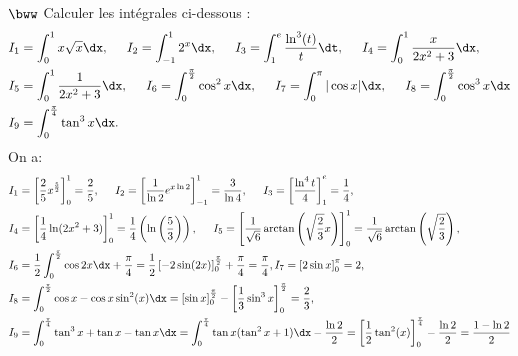 \documentclass[11pt]{article}
\begin{document}
\begin{exercice}{$\bww$}{}
    Calculer les intégrales ci-dessous :
    \begin{align*}
        &I_1 = \int_0^1{x\sqrt{x}\dx}, \hspace{0.5cm} I_2 = \int_{-1}^1{2^x\dx}, \hspace{0.5cm} I_3=\int_1^e{\frac{\ln^3(t)}{t}\dt}, \hspace{0.5cm} I_4=\int_0^1{\frac{x}{2x^2+3}\dx},\\
        &I_5=\int_0^1{\frac{1}{2x^2+3}\dx}, \hspace{0.5cm} I_6=\int_0^{\frac{\pi}{2}}{\cos^2x\dx}, \hspace{0.5cm} I_7=\int_0^\pi{|\cos x|\dx}, \hspace{0.5cm} I_8 = \int_0^{\frac{\pi}{2}}{\cos^3x\dx}\\
        &I_9=\int_0^{\frac{\pi}{4}}{\tan^3x\dx}.
    \end{align*}
    \tcblower
    On a:
    \begin{align*}
        &I_1 = \left[\frac{2}{5}x^{\frac{5}{2}}\right]_0^1=\frac{2}{5}, \hspace{0.5cm} I_2=\left[\frac{1}{\ln2}e^{x\ln2}\right]_{-1}^1=\frac{3}{\ln4}, \hspace{0.5cm} I_3=\left[\frac{\ln^4t}{4}\right]_1^e=\frac{1}{4},\\
        &I_4=\left[\frac{1}{4}\ln(2x^2+3)\right]_0^1=\frac{1}{4}\left(\ln\left(\frac{5}{3}\right)\right), \hspace{0.5cm} I_5 = \left[\frac{1}{\sqrt{6}}\arctan\left(\sqrt{\frac{2}{3}}x\right)\right]_0^1=\frac{1}{\sqrt{6}}\arctan\left(\sqrt{\frac{2}{3}}\right),\\
        &I_6=\frac{1}{2}\int_0^{\frac{\pi}{2}}{\cos2x\dx}+\frac{\pi}{4}=\frac{1}{2}\left[-2\sin(2x)\right]_0^\frac{\pi}{2}+\frac{\pi}{4}=\frac{\pi}{4}, I_7=\left[2\sin x\right]_0^\pi=2,\\
        &I_8=\int_0^{\frac{\pi}{2}}{\cos x-\cos x\sin^2(x)\dx}=\left[\sin x\right]_0^{\frac{\pi}{2}}-\left[\frac{1}{3}\sin^3x\right]_0^\frac{\pi}{2}=\frac{2}{3},\\
        &I_9=\int_0^\frac{\pi}{4}{\tan^3x+\tan x-\tan x\dx}=\int_0^\frac{\pi}{4}{\tan x(\tan^2 x + 1)\dx} - \frac{\ln2}{2}=\left[\frac{1}{2}\tan^2(x)\right]_0^\frac{\pi}{4}-\frac{\ln2}{2}=\frac{1-\ln2}{2} 
    \end{align*}
\end{exercice}
\end{document}
